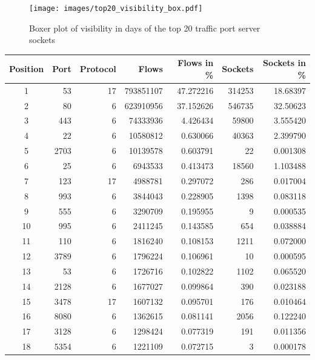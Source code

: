 \begin{landscape}
\begin{figure}
	[p] \centering 
	\texttt{[image: images/top20\_visibility\_box.pdf]}
	\caption{Boxer plot of visibility in days of the top 20 traffic port server sockets}
	\label{fig:top20_visibledays_box}
\end{figure}
\end{landscape}


\begin{table}
	[ht] \centering 
	\begin{tabular}
		{|c|r|r|r|r|r|r|} \hline \textbf{Position} & \textbf{Port} & \textbf{Protocol} & \textbf{Flows} &\textbf{ Flows in \%} & \textbf{Sockets} & \textbf{Sockets in \%}\\
		\hline \hline 1 & 53 & 17 &793851107 & 47.272216 & 314253 & 18.68397\\
		\hline 2 & 80 & 6 &623910956 & 37.152626 & 546735 & 32.50623\\
		\hline 3 & 443 & 6 & 74333936 & 4.426434 & 59800 & 3.555420\\
		\hline 4 & 22 & 6 & 10580812 & 0.630066 & 40363 & 2.399790\\
		\hline 5 & 2703 & 6 & 10139578 & 0.603791 & 22 & 0.001308\\
		\hline 6 & 25 & 6 & 6943533 & 0.413473 & 18560 & 1.103488\\
		\hline 7 & 123 & 17 & 4988781 & 0.297072 & 286 & 0.017004\\
		\hline 8 & 993 & 6 & 3844043 & 0.228905 & 1398 & 0.083118\\
		\hline 9 & 555 & 6 & 3290709 & 0.195955 & 9 & 0.000535\\
		\hline 10 & 995 & 6 & 2411245 & 0.143585 & 654 & 0.038884\\
		\hline 11 & 110 & 6 & 1816240 & 0.108153 & 1211 & 0.072000\\
		\hline 12 & 3789 & 6 & 1796224 & 0.106961 & 10 & 0.000595\\
		\hline 13 & 53 & 6 & 1726716 & 0.102822 & 1102 & 0.065520\\
		\hline 14 & 2128 & 6 & 1677027 & 0.099864 & 390 & 0.023188\\
		\hline 15 & 3478 & 17 & 1607132 & 0.095701 & 176 & 0.010464\\
		\hline 16 & 8080 & 6 & 1362615 & 0.081141 & 2056 & 0.122240\\
		\hline 17 & 3128 & 6 & 1298424 & 0.077319 & 191 & 0.011356\\
		\hline 18 & 5354 & 6 & 1221109 & 0.072715 & 3 & 0.000178\\

\end{tabular}
\end{table}
